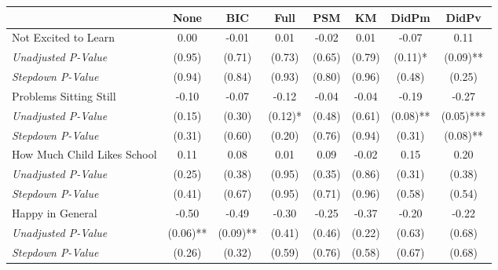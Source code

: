 \begin{tabular}{l c c c c c c c}
\toprule
 & None & BIC & Full & PSM & KM & DidPm & DidPv \\
\midrule
Not Excited to Learn & 0.00 & -0.01 & 0.01 & -0.02 & 0.01 & -0.07 & 0.11 \\
\quad \textit{Unadjusted P-Value} & (0.95) & (0.71) & (0.73) & (0.65) & (0.79) & (0.11)* & (0.09)** \\
\quad \textit{Stepdown P-Value} & (0.94) & (0.84) & (0.93) & (0.80) & (0.96) & (0.48) & (0.25) \\
Problems Sitting Still & -0.10 & -0.07 & -0.12 & -0.04 & -0.04 & -0.19 & -0.27 \\
\quad \textit{Unadjusted P-Value} & (0.15) & (0.30) & (0.12)* & (0.48) & (0.61) & (0.08)** & (0.05)*** \\
\quad \textit{Stepdown P-Value} & (0.31) & (0.60) & (0.20) & (0.76) & (0.94) & (0.31) & (0.08)** \\
How Much Child Likes School & 0.11 & 0.08 & 0.01 & 0.09 & -0.02 & 0.15 & 0.20 \\
\quad \textit{Unadjusted P-Value} & (0.25) & (0.38) & (0.95) & (0.35) & (0.86) & (0.31) & (0.38) \\
\quad \textit{Stepdown P-Value} & (0.41) & (0.67) & (0.95) & (0.71) & (0.96) & (0.58) & (0.54) \\
Happy in General & -0.50 & -0.49 & -0.30 & -0.25 & -0.37 & -0.20 & -0.22 \\
\quad \textit{Unadjusted P-Value} & (0.06)** & (0.09)** & (0.41) & (0.46) & (0.22) & (0.63) & (0.68) \\
\quad \textit{Stepdown P-Value} & (0.26) & (0.32) & (0.59) & (0.76) & (0.58) & (0.67) & (0.68) \\
\bottomrule
\end{tabular}
